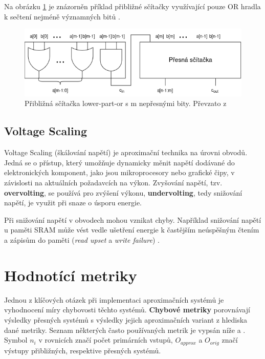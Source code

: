Na obrázku \ref{fig:approx_adder} je znázorněn příklad přibližné sčítačky využívající pouze OR hradla k sečtení nejméně významných bitů \cite{log_mults}.

\begin{figure}[H]
    \centering
    \includegraphics[width=\textwidth]{obrazky-figures/scitacka.png}
    \caption{Přibližná sčítačka lower-part-or s m nepřesnými bity. Převzato z \cite{log_mults}}
    \label{fig:approx_adder}
\end{figure}

\subsection*{Voltage Scaling}
Voltage Scaling (škálování napětí) je aproximační technika na úrovni obvodů. Jedná se o přístup, který umožňuje dynamicky měnit napětí dodávané do elektronických komponent, jako jsou mikroprocesory nebo grafické čipy, v závislosti na aktuálních požadavcích na výkon. Zvyšování napětí, tzv. \textbf{overvolting}, se používá pro zvýšení výkonu, \textbf{undervolting}, tedy snižování napětí, je využit při snaze o úsporu energie.

Při snižování napětí v obvodech mohou vznikat chyby. Například snižování napětí u paměti SRAM může vést vedle ušetření energie k častějším neúspěšným čtením a zápisům do paměti (\textit{read upset} a \textit{write failure}) \cite{ac_techniques}.

\pagebreak

\section{Hodnotící metriky} \label{error_metrics}
Jednou z klíčových otázek při implementaci aproximačních systémů je vyhodnocení míry chybovosti těchto systémů. \textbf{Chybové metriky} porovnávají výsledky přesných systémů s výsledky jejich aproximačních variant z hlediska dané metriky. Seznam některých často používaných metrik je vypsán níže \cite{circuit_library} a \cite{error_metrics}. Symbol $n_i$ v rovnicích značí počet primárních vstupů, $O_{approx}$ a $O_{orig}$ značí výstupy přibližných, respektive přesných systémů.

